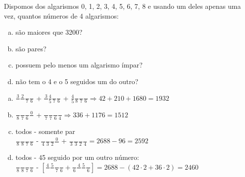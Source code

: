 \begin{ex}
Dispomos dos algarismos 0, 1, 2, 3, 4, 5, 6, 7, 8 e usando um deles apenas uma vez, quantos números de 4 algarismos:
   \begin{enumerate}[(a)]
   \item são maiores que 3200?
   \item são pares?
   \item possuem pelo menos um algarismo ímpar?
   \item não tem o 4 e o 5 seguidos um do outro?
   \end{enumerate}
     \begin{sol}
       \phantom{A} 
         \begin{enumerate} [(a)]
             \item $\frac{3}{\phantom{A}}\frac{2}{\phantom{A}}\frac{\phantom{A}}{7}\frac{\phantom{A}}{6}$ + $\frac{3}{\phantom{A}}\frac{4}{5}\frac{\phantom{A}}{7}\frac{\phantom{A}}{6}$ +
             $\frac{4}{5}\frac{\phantom{A}}{8}\frac{\phantom{A}}{7}\frac{\phantom{A}}{6}\Longrightarrow 42+210+1680=1932$
             \item $\frac{\phantom{A}}{8}\frac{\phantom{A}}{7}\frac{\phantom{A}}{6}\frac{0}{\phantom{A}}$ + $\frac{\phantom{A}}{7}\frac{\phantom{A}}{7}\frac{\phantom{A}}{6}\frac{\phantom{A}}{4}\Longrightarrow336+1176=1512$
             \item todos - somente par \\
             $\frac{\phantom{A}}{8}\frac{\phantom{A}}{8}\frac{\phantom{A}}{7}\frac{\phantom{A}}{6}$ - $\frac{\phantom{A}}{4}\frac{\phantom{A}}{3}\frac{\phantom{A}}{2}\frac{0}{\phantom{A}}$ + $\frac{\phantom{A}}{3}\frac{\phantom{A}}{3}\frac{\phantom{A}}{2}\frac{\phantom{A}}{4}= 2688 - 96 =2592$
             \item todos - 45 seguido por um outro número: \\
             $\frac{\phantom{A}}{8}\frac{\phantom{A}}{8}\frac{\phantom{A}}{7}\frac{\phantom{A}}{6}$ - $[\frac{4}{\phantom{A}}\frac{5}{\phantom{A}}\frac{\phantom{A}}{7}\frac{\phantom{A}}{6}+\frac{\phantom{A}}{6}\frac{4}{\phantom{A}}\frac{5}{\phantom{A}}\frac{\phantom{A}}{6} ]= 2688-(42\cdot2+36\cdot2)=2460$
             
         \end{enumerate}
     \end{sol}
\end{ex}